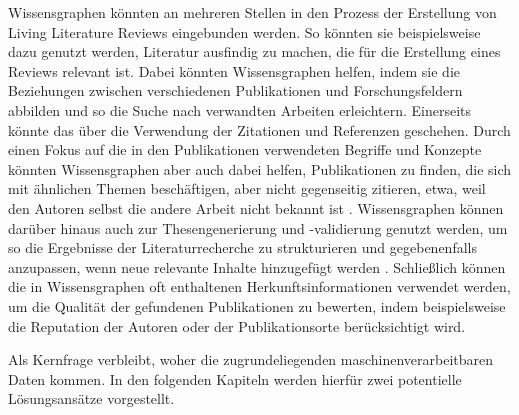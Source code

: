 Wissensgraphen könnten an mehreren Stellen in den Prozess der Erstellung von Living Literature Reviews eingebunden werden.
So könnten sie beispielsweise dazu genutzt werden, Literatur ausfindig zu machen, die für die Erstellung eines Reviews relevant ist.
Dabei könnten Wissensgraphen helfen, indem sie die Beziehungen zwischen verschiedenen Publikationen und Forschungsfeldern abbilden und so die Suche nach verwandten Arbeiten erleichtern.
Einerseits könnte das über die Verwendung der Zitationen und Referenzen geschehen.
Durch einen Fokus auf die in den Publikationen verwendeten Begriffe und Konzepte könnten Wissensgraphen aber auch dabei helfen, Publikationen zu finden, die sich mit ähnlichen Themen beschäftigen, aber nicht gegenseitig zitieren, etwa, weil den Autoren selbst die andere Arbeit nicht bekannt ist \cite{citation-recommendation}.
Wissensgraphen können darüber hinaus auch zur Thesengenerierung und -validierung genutzt werden, um so die Ergebnisse der Literaturrecherche zu strukturieren und gegebenenfalls anzupassen, wenn neue relevante Inhalte hinzugefügt werden \cite{DESSI2022109945}.
Schließlich können die in Wissensgraphen oft enthaltenen Herkunftsinformationen verwendet werden, um die Qualität der gefundenen Publikationen zu bewerten, indem beispielsweise die Reputation der Autoren oder der Publikationsorte berücksichtigt wird.

Als Kernfrage verbleibt, woher die zugrundeliegenden maschinenverarbeitbaren Daten kommen.
In den folgenden Kapiteln werden hierfür zwei potentielle Lösungsansätze vorgestellt.